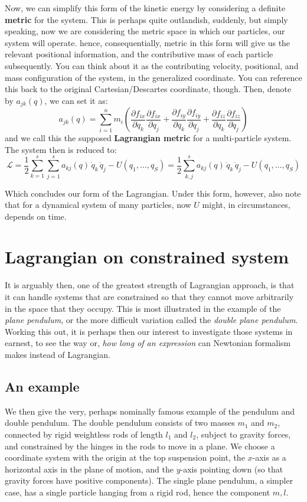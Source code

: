 Now, we can simplify this form of the kinetic energy by considering a definite \textbf{metric} for the system. This is perhaps quite outlandish, suddenly, but simply speaking, now we are considering the metric space in which our particles, our system will operate. hence, consequentially, metric in this form will give us the relevant positional information, and the contributive mass of each particle subsequently. You can think about it as the contributing velocity, positional, and mass configuration of the system, in the generalized coordinate. You can reference this back to the original Cartesian/Descartes coordinate, though. Then, denote by $a_{jk}(q)$, we can set it as: 
$$
a_{jk} (q) = \sum_{i=1}^n m_i
       \left(
         \frac{\partial f_{ix}}{\partial q_k}\frac{\partial f_{ix}}{\partial q_j}
        +\frac{\partial f_{iy}}{\partial q_k}\frac{\partial f_{iy}}{\partial q_j}
        +\frac{\partial f_{iz}}{\partial q_k}\frac{\partial f_{iz}}{\partial q_j}
       \right)
$$
and we call this the supposed \textbf{Lagrangian metric} for a multi-particle system. The system then is reduced to: 
$$
\mathcal{L} = \frac{1}{2}\sum_{k=1}^s\sum_{j=1}^s a_{kj}(q)\,\dot q_k\,\dot q_j -U(q_{1},\dots,q_{S}) = \frac{1}{2}\sum_{k,j}^s a_{kj}(q)\,\dot q_k\,\dot q_j -U(q_{1},\dots,q_{S})
$$

Which concludes our form of the Lagrangian. Under this form, however, also note that for a dynamical system of many particles, now $U$ might, in circumstances, depends on time. 
\section{Lagrangian on constrained system}
It is arguably then, one of the greatest strength of Lagrangian approach, is that it can handle systems that are constrained so that they cannot move arbitrarily in the space that they occupy. This is most illustrated in the example of the \textit{plane pendulum}, or the more difficult variation called the \textit{double plane pendulum}. Working this out, it is perhaps then our interest to investigate those systems in earnest, to see the way or, \textit{how long of an expression} can Newtonian formalism makes instead of Lagrangian. 

\subsection{An example}
We then give the very, perhaps nominally famous example of the pendulum and double pendulum. The double pendulum consists of two masses $m_{1}$ and $m_{2}$, connected by rigid weightless rods of length $l_{1}$ and $l_{2}$, subject to gravity forces, and constrained by the hinges in the rods to move in a plane. We choose a coordinate system with the origin at the top suspension point, the $x$-axis as a horizontal axis in the plane of motion, and the $y$-axis pointing down (so that gravity forces have positive components). The single plane pendulum, a simpler case, has a single particle hanging from a rigid rod, hence the component $m,l$. 


